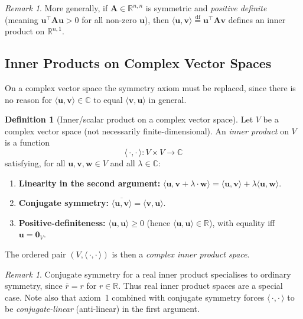 \documentclass[11pt, a4paper, notitlepage]{report}
\theoremstyle{definition}
\newtheorem{definition}[theorem]{Definition}
\theoremstyle{remark}
\newtheorem{remark}[theorem]{Remark}
\begin{document}
\begin{remark}
More generally, if $\mathbf{A} \in \mathbb{R}^{n,n}$ is symmetric and \emph{positive definite}
(meaning $\mathbf{u}^\top\mathbf{A}\mathbf{u} > 0$ for all non-zero $\mathbf{u}$), then
$\langle\mathbf{u},\mathbf{v}\rangle \stackrel{\mathrm{df}}{=} \mathbf{u}^\top\mathbf{A}\mathbf{v}$
defines an inner product on $\mathbb{R}^{n,1}$.
\end{remark}

\subsection{Inner Products on Complex Vector Spaces}
\label{subsec:complex-ip}

On a complex vector space the symmetry axiom must be replaced, since there is no reason for
$\langle\mathbf{u},\mathbf{v}\rangle \in \mathbb{C}$ to equal $\langle\mathbf{v},\mathbf{u}\rangle$
in general.

\begin{definition}[Inner/scalar product on a complex vector space]
\label{def:complex-inner-product}
Let $V$ be a complex vector space (not necessarily finite-dimensional).
An \emph{inner product} on $V$ is a function
\[
  \langle\,\cdot,\cdot\,\rangle : V \times V \to \mathbb{C}
\]
satisfying, for all $\mathbf{u},\mathbf{v},\mathbf{w} \in V$ and all $\lambda \in \mathbb{C}$:
\begin{enumerate}
  \item \textbf{Linearity in the second argument:}
        $\langle\mathbf{u},\mathbf{v}+\lambda\cdot\mathbf{w}\rangle
         = \langle\mathbf{u},\mathbf{v}\rangle + \lambda\langle\mathbf{u},\mathbf{w}\rangle$.
  \item \textbf{Conjugate symmetry:}
        $\overline{\langle\mathbf{u},\mathbf{v}\rangle} = \langle\mathbf{v},\mathbf{u}\rangle$.
  \item \textbf{Positive-definiteness:}
        $\langle\mathbf{u},\mathbf{u}\rangle \geq 0$ (hence $\langle\mathbf{u},\mathbf{u}\rangle \in \mathbb{R}$),
        with equality iff $\mathbf{u} = \mathbf{0}_V$.
\end{enumerate}
The ordered pair $(V,\langle\,\cdot,\cdot\,\rangle)$ is then a \emph{complex inner product space}.
\end{definition}

\begin{remark}
Conjugate symmetry for a real inner product specialises to ordinary symmetry, since $\overline{r} = r$
for $r \in \mathbb{R}$. Thus real inner product spaces are a special case.
Note also that axiom~1 combined with conjugate symmetry forces $\langle\,\cdot,\cdot\,\rangle$ to be
\emph{conjugate-linear} (anti-linear) in the first argument.
\end{remark}
\end{document}
